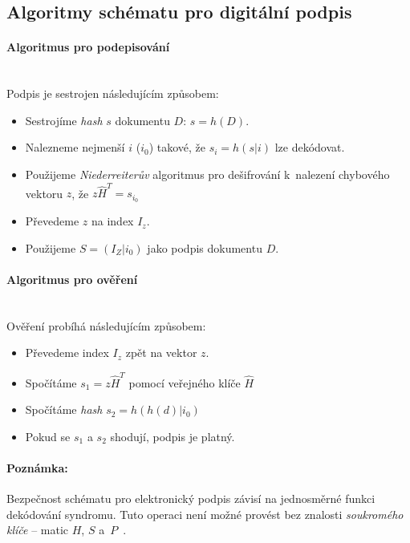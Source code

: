 \documentclass[thesis=M,czech,hidelinks]{FITthesis}[2012/06/26]
\newcommand{\0}{{\textcolor[gray]{0.80}{0}}}
\begin{document}
\subsection{Algoritmy schématu pro digitální podpis}

\paragraph{Algoritmus pro podepisování} \hfil \\
Podpis je sestrojen následujícím způsobem:

\begin{itemize}
    \item Sestrojíme \emph{hash} $s$ dokumentu $D$: $s = h(D)$.
    \item Nalezneme nejmenší $i$ ($i_0$) takové, že $s_i = h(s|i)$ lze dekódovat.
    \item Použijeme \emph{Niederreiterův} algoritmus pro dešifrování k~nalezení
        chybového vektoru $z$, že $z\hat{H}^T = s_{i_0}$
    \item Převedeme $z$ na index $I_z$.
    \item Použijeme $S=(I_Z|i_0)$ jako podpis dokumentu $D$.
\end{itemize}

\paragraph{Algoritmus pro ověření} \hfil \\
Ověření probíhá následujícím způsobem:

\begin{itemize}
    \item Převedeme index $I_z$ zpět na vektor $z$.
    \item Spočítáme $s_1 = z\hat{H}^T$ pomocí veřejného klíče $\hat{H}$
    \item Spočítáme \emph{hash} $s_2 = h(h(d)|i_0)$
    \item Pokud se $s_1$ a $s_2$ shodují, podpis je platný.
\end{itemize}

\paragraph{Poznámka:} Bezpečnost schématu pro elektronický podpis závisí na
jednosměrné funkci dekódování syndromu. Tuto operaci není možné provést bez
znalosti \emph{soukromého klíče} -- matic $H$, $S$
a~$P$~\cite{Niederreiter,XingLi}.
\end{document}
